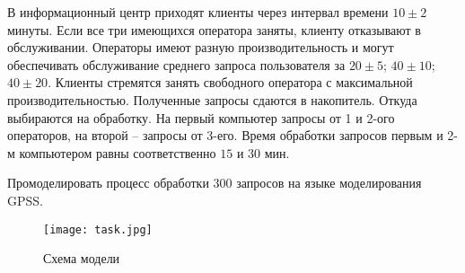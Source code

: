 В информационный центр приходят клиенты через интервал времени $10\pm2$ минуты. Если все три имеющихся оператора заняты, клиенту отказывают в обслуживании. Операторы имеют разную производительность и могут обеспечивать обслуживание среднего запроса пользователя за $20\pm5$; $40\pm10$; $40\pm20$. Клиенты стремятся занять свободного оператора с максимальной производительностью. Полученные запросы сдаются в накопитель. Откуда выбираются на обработку. На первый компьютер запросы от 1 и 2-ого операторов, на второй – запросы от 3-его. Время обработки запросов первым и 2-м компьютером равны соответственно $15$ и $30$ мин.

Промоделировать процесс обработки 300 запросов на языке моделирования GPSS.

\begin{figure}[h]
	\begin{center}
		{\texttt{[image: task.jpg]}
			\caption{Схема модели}
			\label{pic:1}}
	\end{center}
\end{figure}